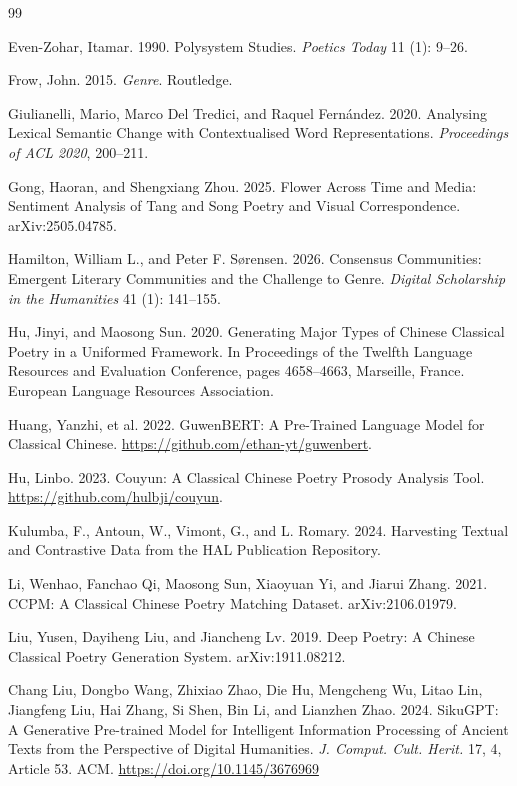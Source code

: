 \documentclass[12pt,a4paper]{article}
\numberwithin{equation}{section}
\begin{document}
{\begin{thebibliography}{99}
\item Even-Zohar, Itamar. 1990. Polysystem Studies. \textit{Poetics Today} 11 (1): 9--26.

\item Frow, John. 2015. \textit{Genre}. Routledge.

\item Giulianelli, Mario, Marco Del Tredici, and Raquel Fern\'andez. 2020. Analysing Lexical Semantic Change with Contextualised Word Representations. \textit{Proceedings of ACL 2020}, 200--211.

\item Gong, Haoran, and Shengxiang Zhou. 2025. Flower Across Time and Media: Sentiment Analysis of Tang and Song Poetry and Visual Correspondence. arXiv:2505.04785.

\item Hamilton, William L., and Peter F. S\o rensen. 2026. Consensus Communities: Emergent Literary Communities and the Challenge to Genre. \textit{Digital Scholarship in the Humanities} 41 (1): 141--155.

\item Hu, Jinyi, and Maosong Sun. 2020. Generating Major Types of Chinese Classical Poetry in a Uniformed Framework. In Proceedings of the Twelfth Language Resources and Evaluation Conference, pages 4658--4663, Marseille, France. European Language Resources Association.

\item Huang, Yanzhi, et al. 2022. GuwenBERT: A Pre-Trained Language Model for Classical Chinese. \url{https://github.com/ethan-yt/guwenbert}.

\item Hu, Linbo. 2023. Couyun: A Classical Chinese Poetry Prosody Analysis Tool. \url{https://github.com/hulbji/couyun}.


\item Kulumba, F., Antoun, W., Vimont, G., and L. Romary. 2024. Harvesting Textual and Contrastive Data from the HAL Publication Repository.

\item Li, Wenhao, Fanchao Qi, Maosong Sun, Xiaoyuan Yi, and Jiarui Zhang. 2021. CCPM: A Classical Chinese Poetry Matching Dataset. arXiv:2106.01979.

\item Liu, Yusen, Dayiheng Liu, and Jiancheng Lv. 2019. Deep Poetry: A Chinese Classical Poetry Generation System. arXiv:1911.08212.

\item Chang Liu, Dongbo Wang, Zhixiao Zhao, Die Hu, Mengcheng Wu, Litao Lin, Jiangfeng Liu, Hai Zhang, Si Shen, Bin Li, and Lianzhen Zhao. 2024. SikuGPT: A Generative Pre-trained Model for Intelligent Information Processing of Ancient Texts from the Perspective of Digital Humanities. \textit{J. Comput. Cult. Herit.} 17, 4, Article 53. ACM. \url{https://doi.org/10.1145/3676969}


\end{thebibliography}}
\end{document}
